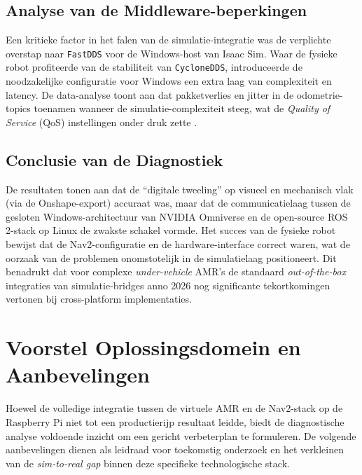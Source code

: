 \subsection{Analyse van de Middleware-beperkingen}
Een kritieke factor in het falen van de simulatie-integratie was de verplichte overstap naar \texttt{FastDDS} voor de Windows-host van Isaac Sim. Waar de fysieke robot profiteerde van de stabiliteit van \texttt{CycloneDDS}, introduceerde de noodzakelijke configuratie voor Windows een extra laag van complexiteit en latency. De data-analyse toont aan dat pakketverlies en jitter in de odometrie-topics toenamen wanneer de simulatie-complexiteit steeg, wat de \textit{Quality of Service} (QoS) instellingen onder druk zette \autocite{Robotics2026}.

\subsection{Conclusie van de Diagnostiek}
De resultaten tonen aan dat de ``digitale tweeling'' op visueel en mechanisch vlak (via de Onshape-export) accuraat was, maar dat de communicatielaag tussen de gesloten Windows-architectuur van NVIDIA Omniverse en de open-source ROS 2-stack op Linux de zwakste schakel vormde. Het succes van de fysieke robot bewijst dat de Nav2-configuratie en de hardware-interface correct waren, wat de oorzaak van de problemen onomstotelijk in de simulatielaag positioneert. Dit benadrukt dat voor complexe \textit{under-vehicle} AMR's de standaard \textit{out-of-the-box} integraties van simulatie-bridges anno 2026 nog significante tekortkomingen vertonen bij cross-platform implementaties.

\section{Voorstel Oplossingsdomein en Aanbevelingen}
\label{sec:oplossingsdomein}

Hoewel de volledige integratie tussen de virtuele AMR en de Nav2-stack op de Raspberry Pi niet tot een productierijp resultaat leidde, biedt de diagnostische analyse voldoende inzicht om een gericht verbeterplan te formuleren. De volgende aanbevelingen dienen als leidraad voor toekomstig onderzoek en het verkleinen van de \textit{sim-to-real gap} binnen deze specifieke technologische stack.

